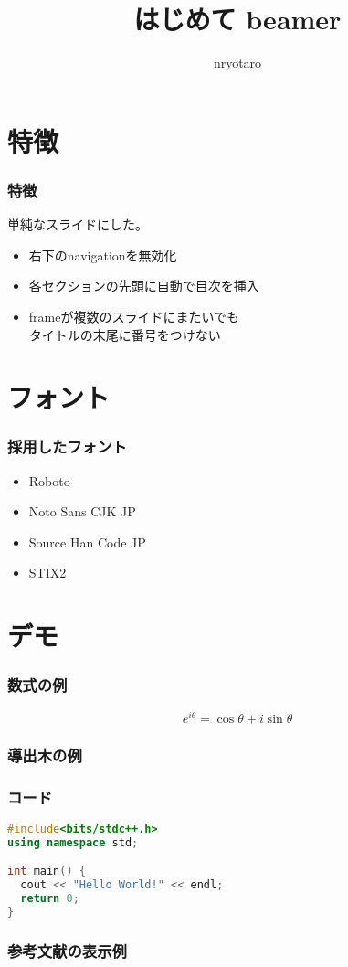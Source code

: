 \documentclass[unicode, 14pt]{beamer}
\title{はじめて beamer}
\author{nryotaro}
\begin{document}
\begin{frame}
\titlepage
\end{frame}
\section{特徴}
\begin{frame}[t]
  \frametitle{特徴}
  単純なスライドにした。
  \vspace{0.2\paperheight}
  \begin{itemize}
    \item 右下のnavigationを無効化
    \item 各セクションの先頭に自動で目次を挿入
    \item frameが複数のスライドにまたいでも\\タイトルの末尾に番号をつけない
  \end{itemize}
\end{frame}

\section{フォント}

\begin{frame}
\frametitle{採用したフォント}
\begin{itemize}
  \item Roboto
  \item Noto Sans CJK JP
  \item Source Han Code JP
  \item STIX2
\end{itemize}
\end{frame}

\section{デモ}

\begin{frame}
  \frametitle{数式の例}
  \begin{equation}
    e^{i\theta} = \cos\theta + i\sin \theta
  \end{equation}
\end{frame}

\begin{frame}
  \frametitle{導出木の例}
  \begin{prooftree}
  \end{prooftree}
\end{frame}

\begin{frame}[fragile]
\frametitle{コード}
  {\small 
    \begin{lstlisting}[language=C++]
#include<bits/stdc++.h>
using namespace std;

int main() {
  cout << "Hello World!" << endl;
  return 0;
}
    \end{lstlisting}
}
\end{frame}

\begin{frame}[allowframebreaks]
  \frametitle{参考文献の表示例}
  \printbibliography
  \nocite{*} 
\end{frame}
\end{document}
